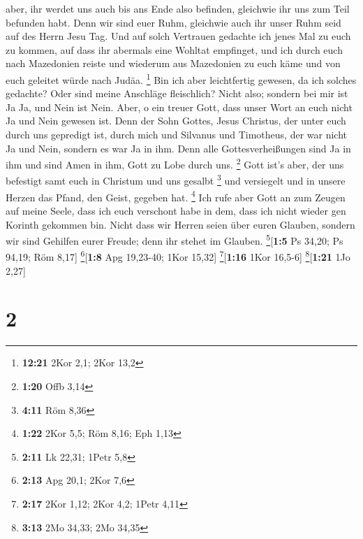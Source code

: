 aber, ihr werdet uns auch bis ans Ende also befinden, gleichwie ihr uns
zum Teil befunden habt.  Denn wir sind euer Ruhm,
gleichwie auch ihr unser Ruhm seid auf des Herrn Jesu Tag.
 Und auf solch Vertrauen gedachte ich jenes Mal zu euch
zu kommen, auf dass ihr abermals eine Wohltat empfinget, 
und ich durch euch nach Mazedonien reiste und wiederum aus Mazedonien zu
euch käme und von euch geleitet würde nach Judäa. \footnote{\textbf{12:21}
  2Kor 2,1; 2Kor 13,2}  Bin ich aber leichtfertig
gewesen, da ich solches gedachte? Oder sind meine Anschläge fleischlich?
Nicht also; sondern bei mir ist Ja Ja, und Nein ist Nein.
 Aber, o ein treuer Gott, dass unser Wort an euch nicht
Ja und Nein gewesen ist.  Denn der Sohn Gottes, Jesus
Christus, der unter euch durch uns gepredigt ist, durch mich und
Silvanus und Timotheus, der war nicht Ja und Nein, sondern es war Ja in
ihm.  Denn alle Gottesverheißungen sind Ja in ihm und
sind Amen in ihm, Gott zu Lobe durch uns. \footnote{\textbf{1:20} Offb
  3,14}  Gott ist's aber, der uns befestigt samt euch in
Christum und uns gesalbt \footnote{\textbf{4:11} Röm 8,36}
 und versiegelt und in unsere Herzen das Pfand, den
Geist, gegeben hat. \footnote{\textbf{1:22} 2Kor 5,5; Röm 8,16; Eph 1,13}
 Ich rufe aber Gott an zum Zeugen auf meine Seele, dass
ich euch verschont habe in dem, dass ich nicht wieder gen Korinth
gekommen bin.  Nicht dass wir Herren seien über euren
Glauben, sondern wir sind Gehilfen eurer Freude; denn ihr stehet im
Glauben. \footnote{\textbf{2:11} Lk 22,31; 1Petr 5,8}{[}\textbf{1:5} Ps
34,20; Ps 94,19; Röm 8,17{]} \footnote{\textbf{2:13} Apg 20,1; 2Kor 7,6}{[}\textbf{1:8}
Apg 19,23-40; 1Kor 15,32{]} \footnote{\textbf{2:17} 2Kor 1,12; 2Kor 4,2;
  1Petr 4,11}{[}\textbf{1:16} 1Kor 16,5-6{]} \footnote{\textbf{3:13} 2Mo
  34,33; 2Mo 34,35}{[}\textbf{1:21} 1Jo 2,27{]}

\hypertarget{section-1}{%
\section{2}\label{section-1}}

